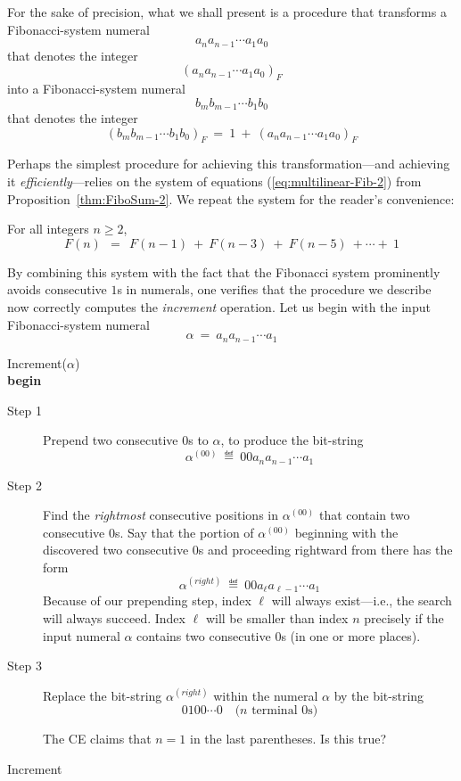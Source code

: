 
\smallskip

\noindent
For the sake of precision, what we shall present is a procedure that transforms a Fibonacci-system numeral
\[ a_n a_{n-1} \cdots a_1 a_0 \]
that denotes the integer
\[ (a_n a_{n-1} \cdots a_1 a_0)_F \]
into a Fibonacci-system numeral
\[ b_m b_{m-1} \cdots b_1 b_0 \]
that denotes the integer
\[ (b_m b_{m-1} \cdots b_1 b_0)_F \ = \ 1 \ + \ (a_n a_{n-1} \cdots a_1 a_0)_F \]

Perhaps the simplest procedure for achieving this transformation---and achieving it {\em efficiently}---relies on the system of equations (\ref{eq:multilinear-Fib-2}) from Proposition~\ref{thm:FiboSum-2}.  We repeat the system for the reader's convenience:

\medskip

\noindent For all integers $n \geq 2$,
\[ F(n) \ \ = \ \ F(n-1) \ + \ F(n-3) \ + \ F(n-5) \ + \cdots + \ 1 \]

\medskip

By combining this system with the fact that the Fibonacci system prominently avoids consecutive $1$s in numerals, one verifies that the procedure we describe now correctly computes the {\em increment} operation.  Let us begin with the input Fibonacci-system numeral
\[ \alpha \ = \  a_n a_{n-1} \cdots a_1 \]

\bigskip

 {\sf Increment}($\alpha$) \\
{\bf begin}
\begin{description}
\item[{\sf Step} 1]
Prepend two consecutive $0$s to $\alpha$, to produce the bit-string
\[  \alpha^{(00)} \ \eqdef \  0 0 a_n a_{n-1} \cdots a_1 \]

\item[{\sf Step} 2]
Find the {\em rightmost} consecutive positions in $\alpha^{(00)}$ that contain two consecutive $0$s.  Say that the portion of $\alpha^{(00)}$ beginning with the discovered two consecutive $0$s and proceeding rightward from there has the form
\[  \alpha^{(right)} \ \eqdef \  0 0 a_\ell a_{\ell-1} \cdots a_1 \]
Because of our prepending step, index $\ell$ will always exist---i.e., the search will always succeed.   Index $\ell$ will be smaller than index $n$ precisely if the input numeral $\alpha$ contains two consecutive $0$s (in one or more places).

\item[{\sf Step} 3]
Replace the bit-string $\alpha^{(right)}$ within the numeral $\alpha$ by the bit-string
\[ 0 1 0 0 \cdots 0 \ \ \ \mbox{ ($n$ terminal $0$s)} \]

{\Arny The CE claims that $n=1$ in the last parentheses.  Is this true?}

\end{description}
 {\sf Increment}


